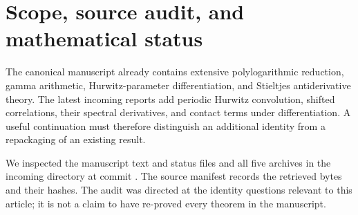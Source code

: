 
\section{Scope, source audit, and mathematical status}\label{mld:sec:scope}

The canonical manuscript already contains extensive polylogarithmic reduction, gamma arithmetic, Hurwitz-parameter differentiation, and Stieltjes antiderivative theory. The latest incoming reports add periodic Hurwitz convolution, shifted correlations, their spectral derivatives, and contact terms under differentiation. A useful continuation must therefore distinguish an additional identity from a repackaging of an existing result.

We inspected the manuscript text and status files and all five archives in the incoming directory at commit
\cite{ProveIt,IncomingResonance,IncomingShifted,IncomingConvolution,IncomingClosure,IncomingCalculus}.
The source manifest records the retrieved bytes and their hashes. The audit was directed at the identity questions relevant to this article; it is not a claim to have re-proved every theorem in the manuscript.

